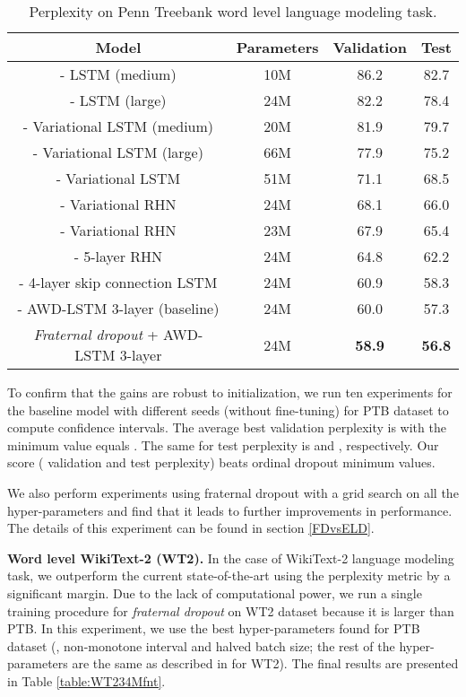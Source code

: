 \documentclass{article} \usepackage{iclr2018_conference,times}
\begin{document}
\begin{table}[t]
\vspace{-0.08cm}
\centering
\begin{tabular}{c | c c c} 
\textbf{Model} & \textbf{Parameters}  & \textbf{Validation} & \textbf{Test}\\
\hline
\cite{zaremba2014recurrent} - LSTM (medium) & 10M & 86.2 & 82.7\\
\cite{zaremba2014recurrent} - LSTM (large) & 24M & 82.2 & 78.4\\
\cite{vdropout} - Variational LSTM (medium) & 20M & 81.9 & 79.7\\
\cite{vdropout} - Variational LSTM (large) & 66M & 77.9 & 75.2\\
\cite{inan2016tying} - Variational LSTM & 51M & 71.1 & 68.5\\
\cite{inan2016tying} - Variational RHN & 24M & 68.1 & 66.0\\
\cite{zilly2016recurrent} - Variational RHN & 23M & 67.9 & 65.4\\
\cite{melis2017state} - 5-layer RHN & 24M & 64.8 & 62.2\\
\cite{melis2017state} - 4-layer skip connection LSTM & 24M & 60.9 & 58.3\\
\hline
\cite{merity2017regularizing} - AWD-LSTM 3-layer (baseline) & 24M & 60.0 & 57.3 \\
\hline
\emph{Fraternal dropout} + AWD-LSTM 3-layer & 24M & \textbf{58.9} & \textbf{56.8}\\
\end{tabular}
\caption{Perplexity on Penn Treebank word level language modeling task.}
\label{table:PTB24M}
\vspace{-0.08cm}
\end{table}

To confirm that the gains are robust to initialization, we run ten experiments for the baseline model with different seeds (without fine-tuning) for PTB dataset to compute confidence intervals. The average best validation perplexity is  with the minimum value equals . The same for test perplexity is  and , respectively. Our score ( validation and  test perplexity) beats ordinal dropout minimum values.

We also perform experiments using fraternal dropout with a grid search on all the hyper-parameters and find that it leads to further improvements in performance. The details of this experiment can be found in section \ref{FDvsELD}. 

\textbf{Word level WikiText-2 (WT2).} In the case of WikiText-2 language modeling task, we outperform the current state-of-the-art using the perplexity metric by a significant margin. Due to the lack of computational power, we run a single training procedure for \emph{fraternal dropout} on WT2 dataset because it is larger than PTB. In this experiment, we use the best hyper-parameters found for PTB dataset (, non-monotone interval  and halved batch size; the rest of the hyper-parameters are the same as described in \cite{melis2017state} for WT2). The final results are presented in Table \ref{table:WT234Mfnt}.
\end{document}
